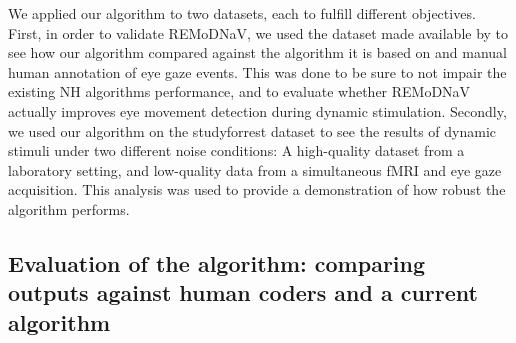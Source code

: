 We applied our algorithm to two datasets, each to fulfill different objectives. First, in order to validate REMoDNaV, we used the dataset made available by \citep{Andersson2017} to see how our algorithm compared against the algorithm it is based on and manual human annotation of eye gaze events. This was done to be sure to not impair the existing NH algorithms performance, and to evaluate whether REMoDNaV actually improves eye movement detection during dynamic stimulation. Secondly, we used our algorithm on the studyforrest dataset \citep{Hanke2016} to see the results of dynamic stimuli under two different noise conditions: A high-quality dataset from a laboratory setting, and low-quality data from a simultaneous fMRI and eye gaze acquisition. This analysis was used to provide a demonstration of how robust the algorithm performs.

\subsection*{Evaluation of the algorithm: comparing outputs against human coders and a current algorithm}\label{ana_1}

